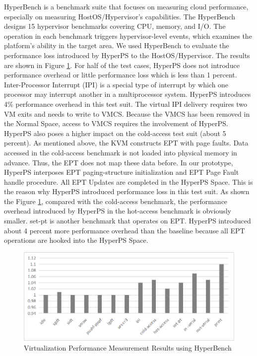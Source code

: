 HyperBench is a benchmark suite that focuses on measuring cloud performance, especially on measuring HostOS/Hypervisor's capabilities. 
The HyperBench designs 15 hypervisor benchmarks covering CPU, memory, and I/O. The operation in each benchmark triggers hypervisor-level events, which examines the platform's ability in the target area. We used HyperBench to evaluate the performance loss introduced by HyperPS to the HostOS/Hypervisor.
The results are shown in Figure \ref{fig:hyperbench}. For half of the test cases, HyperPS does not introduce performance overhead or little performance loss which is less than 1 percent. 
Inter-Processor Interrupt (IPI) is a special type of interrupt by which one processor may interrupt another in a multiprocessor system. 
HyperPS introduces 4\% performance overhead in this test suit. 
The virtual IPI delivery requires two VM exits and needs to write to VMCS. Because the VMCS has been removed in the Normal Space, access to VMCS requires the involvement of HyperPS.  
HyperPS also poses a higher impact on the cold-access test suit (about 5 percent). 
As mentioned above, the KVM constructs EPT with page faults. Data accessed in the cold-access benchmark is not loaded into physical memory in advance. Thus, the EPT does not map these data before. In our prototype, HyperPS interposes EPT paging-structure initialization and EPT Page Fault handle procedure. 
All EPT Updates are completed in the HyperPS Space. This is the reason why HyperPS introduced performance loss in this test suit. 
As shown the Figure \ref{fig:hyperbench}, compared with the cold-access benchmark, the performance overhead introduced by HyperPS in the hot-access benchmark is obviously smaller. 
set-pt is another benchmark that operates on EPT. HyperPS introduced about 4 percent more performance overhead than the baseline because all EPT operations are hooked into the HyperPS Space. 

\begin{figure}[htpb]
    \centering
    \includegraphics[width=0.8\linewidth]{./IMG/hyperbench.png}
    \caption{Virtualization Performance Measurement Results using HyperBench}
    \label{fig:hyperbench}
\end{figure}



